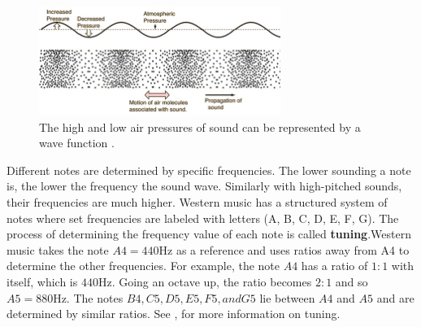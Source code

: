 \documentclass[10pt]{article}
\begin{document}
\begin{figure}[h]
    \centering
    \includegraphics[width=0.7\textwidth]{Sound Waves JPG}
    \caption{The high and low air pressures of sound can be represented by a wave function \cite{nave2017hyperphysics}.} 
    \label{fig:sound wave 1}
\end{figure}

Different notes are determined by specific frequencies. The lower sounding a note is, the lower the frequency the sound wave. Similarly with high-pitched sounds, their frequencies are much higher. Western music has a structured system of notes where set frequencies are labeled with letters (A, B, C, D, E, F, G). The process of determining the frequency value of each note is called \textbf{tuning}.Western music takes the note $A4=440$Hz as a reference and uses ratios away from A4 to determine the other frequencies. For example, the note $A4$ has a ratio of $1:1$ with itself, which is $440$Hz. Going an octave up, the ratio becomes $2:1$ and so $A5=880$Hz.
The notes $B4, C5, D5, E5, F5, and G5$ lie between $A4$ and $A5$ and are determined by similar ratios. 
See \cite{tuningSystems},  for more information on tuning.



\end{document}
